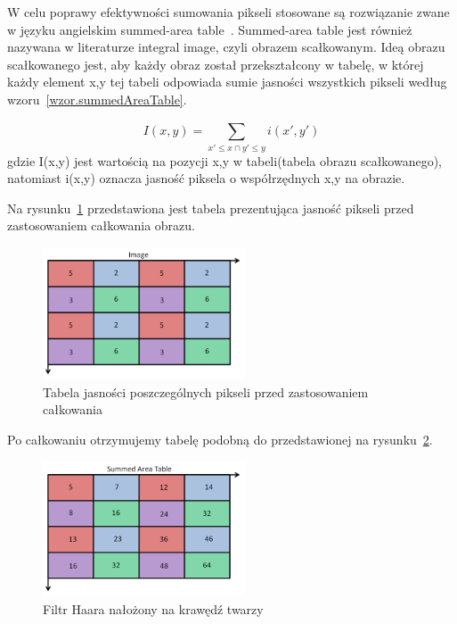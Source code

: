 \documentclass[a4paper,twoside,12pt]{book}
\begin{document}
    W celu poprawy efektywności sumowania pikseli stosowane są
    rozwiązanie zwane w języku angielskim summed-area table~\cite{computerVision}. Summed-area table jest również
    nazywana w literaturze integral image, czyli obrazem scałkowanym.
    Ideą obrazu scałkowanego jest,
    aby każdy obraz
    został
    przekształcony w
    tabelę, w której każdy element x,y tej tabeli odpowiada sumie jasności wszystkich pikseli według wzoru~\ref{wzor.summedAreaTable}.

    \large
    \begin{equation}
        I(x,y) = \sum_{{x}'\leq x \cap {y}'\leq y}^{} i({x}',{y}')
        \label{wzor.summedAreaTable}
    \end{equation}
    \normalsize
    gdzie I(x,y) jest wartością na pozycji x,y w tabeli(tabela obrazu scałkowanego), natomiast i(x,y) oznacza jasność piksela o
    współrzędnych x,y na obrazie.

    Na rysunku~\ref{fig.przedCalkowaniem} przedstawiona jest tabela prezentująca jasność pikseli przed
    zastosowaniem całkowania obrazu.
    \begin{figure}
        \centering
        \includegraphics[width=6cm]{Obrazy/przedCalkowaniem.jpg}
        \caption{Tabela jasności poszczególnych pikseli przed zastosowaniem całkowania~\cite{integralImages}}
        \label{fig.przedCalkowaniem}
    \end{figure}

    Po całkowaniu otrzymujemy tabelę podobną do przedstawionej na rysunku~\ref{fig.poCalkowaniu}.
    \begin{figure}
        \centering
        \includegraphics[width=6cm]{Obrazy/poCalkowaniu.jpg}
        \caption{Filtr Haara nałożony na krawędź twarzy~\cite{integralImages}}
        \label{fig.poCalkowaniu}
    \end{figure}
\end{document}
